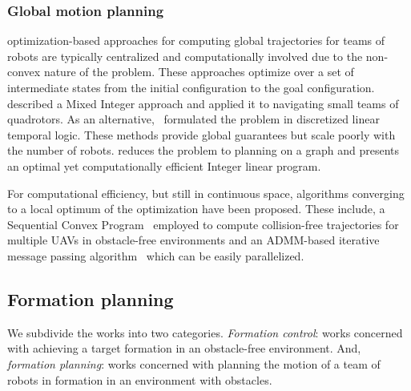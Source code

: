 \subsubsection{Global motion planning}
optimization-based approaches for computing global trajectories for teams of robots are typically centralized and computationally involved due to the non-convex nature of the problem. These approaches optimize over a set of intermediate states from the initial configuration to the goal configuration.
\cite{Mellinger:2012fi} described a Mixed Integer approach and applied it to navigating small teams of quadrotors. As an alternative,~\cite{Saha:2014vi} formulated the problem in discretized linear temporal logic. These methods provide global guarantees but scale poorly with the number of robots. \cite{Yu:2013ij} reduces the problem to planning on a graph and presents an optimal yet computationally efficient Integer linear program.

For computational efficiency, but still in continuous space, algorithms converging to a local optimum of the optimization have been proposed. These include, a Sequential Convex Program~\cite{augugliaro12} employed to compute collision-free trajectories for multiple UAVs in obstacle-free environments and an ADMM-based iterative message passing algorithm~\cite{Bento:2013td} which can be easily parallelized.

\subsection{Formation planning}

We subdivide the works into two categories. \emph{Formation control}: works concerned with achieving a target formation in an obstacle-free environment. And, \emph{formation planning}: works concerned with planning the motion of a team of robots in formation in an environment with obstacles.

